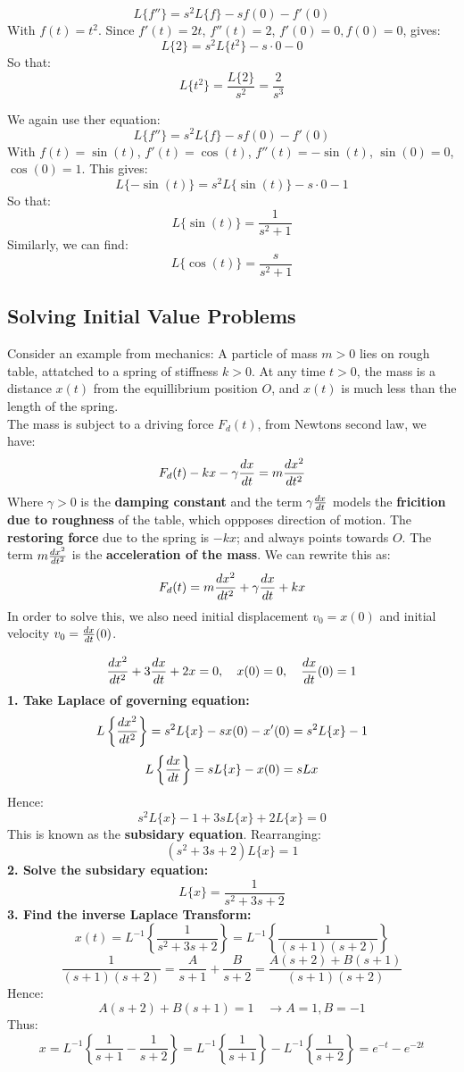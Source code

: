 \documentclass[a4paper, 10pt]{article}
\begin{document}
\begin{examplebox}[Find $L\{t^2\}$ using the fact $L\{s\} = 1/s$ for $s > 0$]
  $$L\{f''\} = s^2 L\{f\} - sf(0) - f'(0)$$
  With $f(t) = t^2$.
  Since $f'(t) = 2t$, $f''(t) = 2$, $f'(0) = 0, f(0) = 0$, gives:
  $$L\{2\} = s^2 L\{t^2\} - s \cdot 0 - 0$$
  So that:
  $$L\{t^2\} = \frac{L\{2\}}{s^2} = \frac{2}{s^3}$$
\end{examplebox}

\begin{examplebox}
  We again use ther equation:
  $$L\{f''\} = s^2 L\{f\} - sf(0) - f'(0)$$
  With $f(t) = \sin(t)$, $f'(t) = \cos(t)$, $f''(t) = -\sin(t)$, $\sin(0) = 0$, $\cos(0) = 1$. This gives:
  $$L\{-\sin(t)\} = s^2 L\{\sin(t)\} - s \cdot 0 - 1$$
  So that:
  $$L\{\sin(t)\} = \frac{1}{s^2 + 1}$$
  Similarly, we can find:
  $$L\{\cos(t)\} = \frac{s}{s^2 + 1}$$
\end{examplebox}
\pagebreak
\subsection{Solving Initial Value Problems}
Consider an example from mechanics: A particle of mass $m > 0$ lies on rough table, attatched to a spring of stiffness $k > 0$. At any time $t > 0$, the mass is a distance $x(t)$ from the equillibrium position $O$, and $x(t)$ is much less than the length of the spring. \\
The mass is subject to a driving force $F_d(t)$, from Newtons second law, we have:
$$F_d(t) - kx - \gamma \frac{dx}{dt} = m \frac{dx^2}{dt^2}$$
Where $\gamma > 0$ is the \textbf{damping constant} and the term $\gamma \frac{dx}{dt}$ models the \textbf{fricition due to roughness} of the table, which oppposes direction of motion. The \textbf{restoring force} due to the spring is $-kx$; and always points towards $O$. The term $m \frac{dx^2}{dt^2}$ is the \textbf{acceleration of the mass}. We can rewrite this as:
$$F_d(t) = m \frac{dx^2}{dt^2} + \gamma \frac{dx}{dt} + kx$$
In order to solve this, we also need initial displacement $v_0 = x(0)$ and initial velocity $v_0 = \frac{dx}{dt}(0)$.

\begin{examplebox}
  \normalsize $$\frac{dx^2}{dt^2} + 3\frac{dx}{dt} + 2x = 0, \quad x(0) = 0, \quad \frac{dx}{dt}(0) = 1$$
  \textbf{1. Take Laplace of governing equation:}
  $$L\left\{\frac{dx^2}{dt^2}\right\} = s^2 L\{x\} - sx(0) - x'(0) = s^2 L\{x\} - 1$$
  $$L\left\{\frac{dx}{dt}\right\} = sL\{x\} - x(0) = sL{x}$$
  Hence:
  $$s^2 L\{x\} - 1 + 3sL\{x\} + 2L\{x\} = 0$$
  This is known as the \textbf{subsidary equation}. Rearranging:
  $$(s^2 + 3s + 2)L\{x\} = 1$$
  \textbf{2. Solve the subsidary equation:}
  $$L\{x\} = \frac{1}{s^2 + 3s + 2}$$
  \textbf{3. Find the inverse Laplace Transform:}
  $$x(t) = L^{-1} \left\{ \frac{1}{s^2 + 3s + 2} \right\} = L^{-1} \left\{ \frac{1}{(s+1)(s+2)}\right\} $$
  $$\frac{1}{(s+1)(s+2)} = \frac{A}{s+1} + \frac{B}{s+2} = \frac{A(s+2) + B(s+1)}{(s+1)(s+2)}$$
  Hence:
  $$A(s+2) + B(s+1) = 1 \quad \rightarrow A = 1, B = -1$$
  Thus:
  $$x = L^{-1} \left\{\frac{1}{s+1} - \frac{1}{s+2}\right\} = L^{-1} \left\{ \frac{1}{s+1}\right\}  - L^{-1}\left\{ \frac{1}{s+2}\right\} = e^{-t} - e^{-2t}$$
\end{examplebox}
\pagebreak
\end{document}
